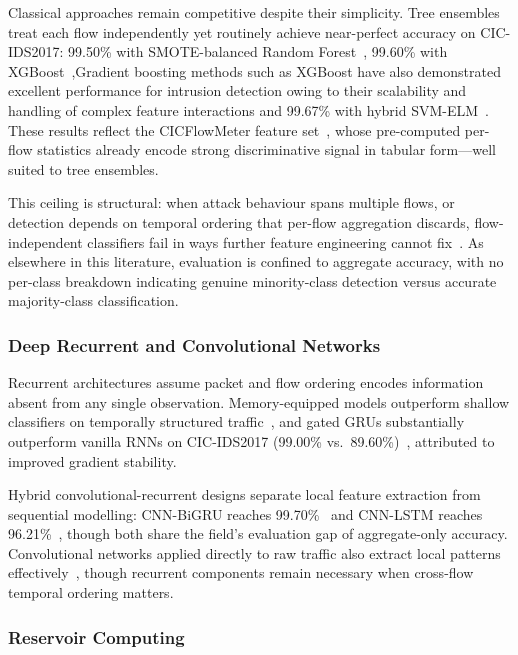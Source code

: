 \documentclass[5p,times]{elsarticle}
\begin{document}
	Classical approaches remain competitive despite their simplicity. Tree
	ensembles treat each flow independently yet routinely achieve
	near-perfect accuracy on CIC-IDS2017: 99.50\% with SMOTE-balanced Random
	Forest~\cite{kurniabudi2020}, 99.60\% with XGBoost~\cite{xgb2023},Gradient boosting methods such as XGBoost have also demonstrated excellent performance for intrusion detection owing to their scalability and handling of complex feature interactions \cite{chen2016} and 99.67\%
	with hybrid SVM-ELM~\cite{svmelm2018}. These results reflect the
	CICFlowMeter feature set~\cite{cicids2017}, whose pre-computed per-flow
	statistics already encode strong discriminative signal in tabular
	form---well suited to tree ensembles.
	
	This ceiling is structural: when attack behaviour spans multiple flows,
	or detection depends on temporal ordering that per-flow aggregation
	discards, flow-independent classifiers fail in ways further feature
	engineering cannot fix~\cite{buczak2016survey}. As elsewhere in this
	literature, evaluation is confined to aggregate accuracy, with no
	per-class breakdown indicating genuine minority-class detection versus
	accurate majority-class classification.
	
	\subsubsection{Deep Recurrent and Convolutional Networks}
	\label{subsec:deeplearning}
	
	Recurrent architectures assume packet and flow ordering encodes
	information absent from any single observation. Memory-equipped models
	outperform shallow classifiers on temporally structured
	traffic~\cite{vinayakumar2019deep,yin2017deep}, and gated GRUs
	substantially outperform vanilla RNNs on CIC-IDS2017 (99.00\% vs.\
	89.60\%)~\cite{grurnn2018}, attributed to improved gradient stability.
	
	Hybrid convolutional-recurrent designs separate local feature extraction
	from sequential modelling: CNN-BiGRU reaches
	99.70\%~\cite{cnnbigru2022} and CNN-LSTM reaches
	96.21\%~\cite{cnnlstm2024}, though both share the field's evaluation gap
	of aggregate-only accuracy. Convolutional networks applied directly to
	raw traffic also extract local patterns
	effectively~\cite{cnn2019}, though recurrent components remain
	necessary when cross-flow temporal ordering matters.
	
	\subsubsection{Reservoir Computing}
	\label{subsec:reservoir}
	
\end{document}

